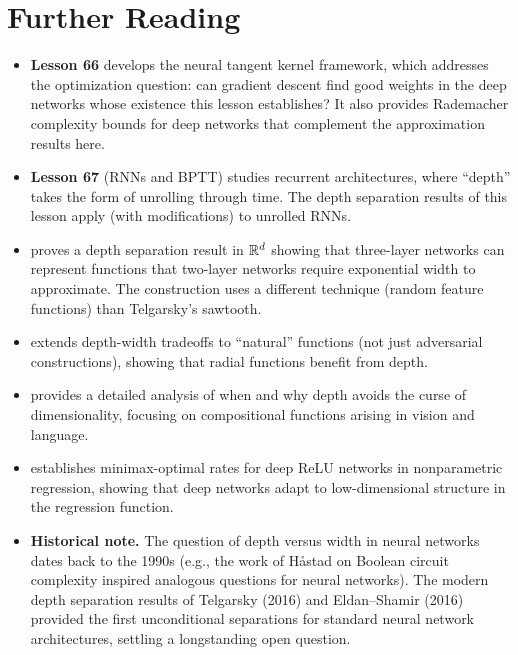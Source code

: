 \documentclass[11pt,a4paper]{article}
\begin{document}
\section{Further Reading}
\label{sec:further-reading}

\begin{itemize}
  \item \textbf{Lesson 66} develops the neural tangent kernel
    framework, which addresses the optimization question: can
    gradient descent find good weights in the deep networks whose
    existence this lesson establishes?  It also provides Rademacher
    complexity bounds for deep networks that complement the
    approximation results here.

  \item \textbf{Lesson 67} (RNNs and BPTT) studies recurrent
    architectures, where ``depth'' takes the form of unrolling through
    time.  The depth separation results of this lesson apply (with
    modifications) to unrolled RNNs.

  \item \citet{eldan2016} proves a depth separation result in
    $\mathbb{R}^d$ showing that three-layer networks can represent functions
    that two-layer networks require exponential width to approximate.
    The construction uses a different technique (random feature
    functions) than Telgarsky's sawtooth.

  \item \citet{safran2017} extends depth-width tradeoffs to
    ``natural'' functions (not just adversarial constructions),
    showing that radial functions benefit from depth.

  \item \citet{poggio2017} provides a detailed analysis of when
    and why depth avoids the curse of dimensionality, focusing on
    compositional functions arising in vision and language.

  \item \citet{schmidt-hieber2020} establishes minimax-optimal
    rates for deep ReLU networks in nonparametric regression,
    showing that deep networks adapt to low-dimensional structure
    in the regression function.

  \item \textbf{Historical note.}  The question of depth versus width
    in neural networks dates back to the 1990s (e.g., the work of
    H\aa stad on Boolean circuit complexity inspired analogous
    questions for neural networks).  The modern depth separation
    results of Telgarsky (2016) and Eldan--Shamir (2016) provided the
    first unconditional separations for standard neural network
    architectures, settling a longstanding open question.
\end{itemize}


\end{document}
